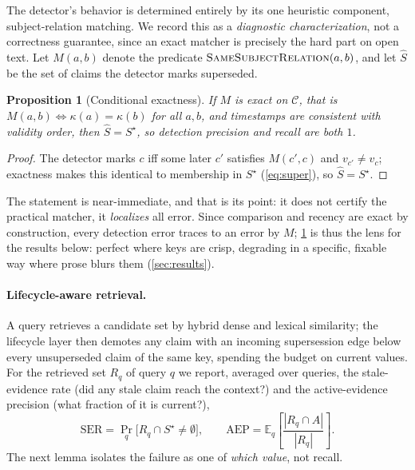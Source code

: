 \documentclass[letterpaper]{article}
\theoremstyle{plain}
\newtheorem{proposition}{Proposition}
\begin{document}
The detector's behavior is determined entirely by its one heuristic component, subject-relation matching. We record this as a \emph{diagnostic characterization}, not a correctness guarantee, since an exact matcher is precisely the hard part on open text. Let $M(a,b)$ denote the predicate $\textsc{SameSubjectRelation}(a,b)$, and let $\hat S$ be the set of claims the detector marks superseded.

\begin{proposition}[Conditional exactness]
\label{prop:sound}
If $M$ is exact on $\mathcal{C}$, that is $M(a,b)\Leftrightarrow\kappa(a){=}\kappa(b)$ for all $a,b$, and timestamps are consistent with validity order, then $\hat S=S^\star$, so detection precision and recall are both $1$.
\end{proposition}
\begin{proof}
The detector marks $c$ iff some later $c'$ satisfies $M(c',c)$ and $v_{c'}{\neq}v_c$; exactness makes this identical to membership in $S^\star$ (\cref{eq:super}), so $\hat S=S^\star$.
\end{proof}

The statement is near-immediate, and that is its point: it does not certify the practical matcher, it \emph{localizes} all error. Since comparison and recency are exact by construction, every detection error traces to an error by $M$; \cref{prop:sound} is thus the lens for the results below: perfect where keys are crisp, degrading in a specific, fixable way where prose blurs them (\cref{sec:results}).

\paragraph{Lifecycle-aware retrieval.} A query retrieves a candidate set by hybrid dense and lexical similarity; the lifecycle layer then demotes any claim with an incoming supersession edge below every unsuperseded claim of the same key, spending the budget on current values. For the retrieved set $R_q$ of query $q$ we report, averaged over queries, the stale-evidence rate (did any stale claim reach the context?) and the active-evidence precision (what fraction of it is current?),
\begin{equation}
\label{eq:ser}
\mathrm{SER}=\Pr_q\!\bigl[R_q\cap S^\star\neq\emptyset\bigr],\qquad
\mathrm{AEP}=\mathbb{E}_q\!\left[\frac{|R_q\cap A|}{|R_q|}\right].
\end{equation}
The next lemma isolates the failure as one of \emph{which value}, not recall.
\end{document}

